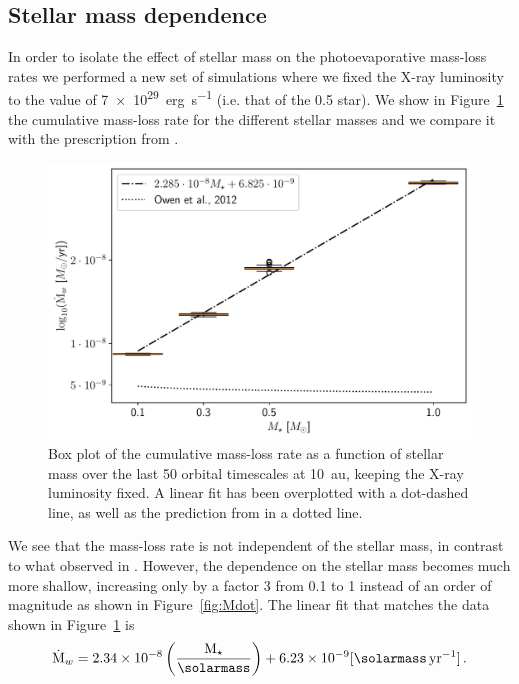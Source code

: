 \documentclass[usenatbib,useAMS,usedcolumn]{mnras}
\begin{document}
\subsection{Stellar mass dependence}\label{sec:mass-dependance}
In order to isolate the effect of stellar mass on the photoevaporative mass-loss rates we performed a new set of simulations where we fixed the X-ray luminosity to the value of \SI{7e29}{erg.s^{-1}} (i.e. that of the \SI{0.5}{\solarmass} star).
We show in Figure~\ref{fig:cumdotMtest} the cumulative mass-loss rate for the different stellar masses and we compare it with the prescription from .
\begin{figure}
  \centering
  \includegraphics[width=\columnwidth]{Figure8}
  \caption{Box plot of the cumulative mass-loss rate as a function of stellar mass over the last 50 orbital timescales at \SI{10}{\astronomicalunit}, keeping the X-ray luminosity fixed. A linear fit has been overplotted with a dot-dashed line, as well as the prediction from  in a dotted line.\label{fig:cumdotMtest}}
\end{figure}
We see that the mass-loss rate is not independent of the stellar mass, in contrast to what observed in . However, the dependence on the stellar mass becomes much more shallow, increasing only by a factor $3$ from \SI{0.1}{\solarmass} to \SI{1}{\solarmass} instead of an order of magnitude as shown in Figure~\ref{fig:Mdot}. The linear fit that matches the data shown in Figure~\ref{fig:cumdotMtest} is
\begin{equation}
    \dot{\mathrm{M}}_w = 2.34 \times 10^{-8} \left(\frac{\mathrm{M}_\star}{\si{\solarmass}}\right) + 6.23 \times 10^{-9} [\si{\solarmass.yr^{-1}}]\,.
\end{equation}
\end{document}

